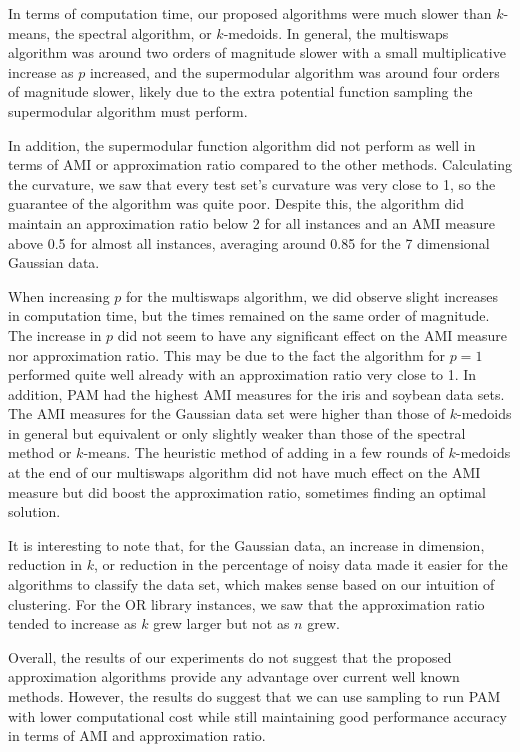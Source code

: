 \documentclass{article}
\begin{document}
In terms of computation time, our proposed algorithms were much slower than $k$-means, the spectral algorithm, or $k$-medoids. In general, the multiswaps algorithm was around two orders of magnitude slower with a small multiplicative increase as $p$ increased, and the supermodular algorithm was around four orders of magnitude slower, likely due to the extra potential function sampling the supermodular algorithm must perform. 

In addition, the supermodular function algorithm did not perform as well in terms of AMI or approximation ratio compared to the other methods. Calculating the curvature, we saw that every  test set's curvature was very close to 1, so the guarantee of the algorithm was quite poor. Despite this, the algorithm did maintain an approximation ratio below 2 for all instances and an AMI measure above 0.5 for almost all instances, averaging around 0.85 for the 7 dimensional Gaussian data. 

When increasing $p$ for the multiswaps algorithm, we did observe slight increases in computation time, but the times remained on the same order of magnitude. The increase in $p$ did not seem to have any significant effect on the AMI measure nor approximation ratio. This may be due to the fact the algorithm for $p=1$ performed quite well already with an approximation ratio very close to 1. In addition, PAM had the highest AMI measures for the iris and soybean data sets. The AMI measures for the Gaussian data set were higher than those of $k$-medoids in general but equivalent or only slightly weaker than those of the spectral method or $k$-means. The heuristic method of adding in a few rounds of $k$-medoids at the end of our multiswaps algorithm did not have much effect on the AMI measure but did boost the approximation ratio, sometimes finding an optimal solution. 

It is interesting to note that, for the Gaussian data, an increase in dimension, reduction in $k$, or reduction in the percentage of noisy data made it easier for the algorithms to classify the data set, which makes sense based on our intuition of clustering. For the OR library instances, we saw that the approximation ratio tended to increase as $k$ grew larger but not as $n$ grew. 

Overall, the results of our experiments do not suggest that the proposed approximation algorithms provide any advantage over current well known methods. However, the results do suggest that we can use sampling to run PAM with lower computational cost while still maintaining good performance accuracy in terms of AMI and approximation ratio. 
\end{document}
